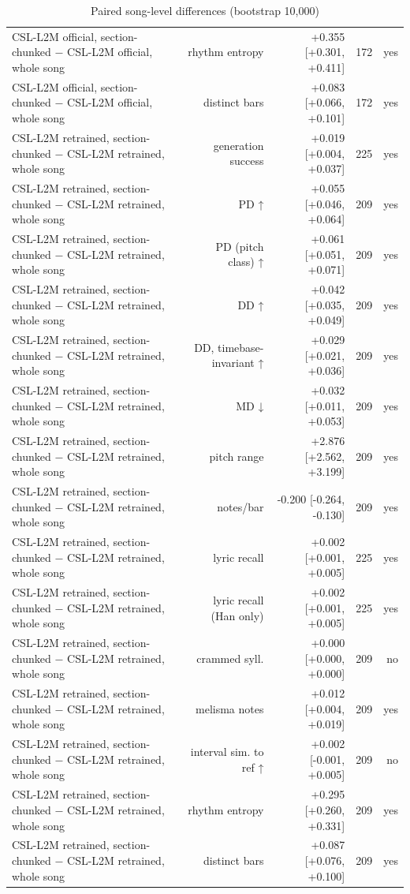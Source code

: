 \begin{table}[t]
\begin{tabular}{lrrrr}
CSL-L2M official, section-chunked $-$ CSL-L2M official, whole song & rhythm entropy & +0.355 [+0.301, +0.411] & 172 & yes \\
CSL-L2M official, section-chunked $-$ CSL-L2M official, whole song & distinct bars & +0.083 [+0.066, +0.101] & 172 & yes \\
CSL-L2M retrained, section-chunked $-$ CSL-L2M retrained, whole song & generation success & +0.019 [+0.004, +0.037] & 225 & yes \\
CSL-L2M retrained, section-chunked $-$ CSL-L2M retrained, whole song & PD ↑ & +0.055 [+0.046, +0.064] & 209 & yes \\
CSL-L2M retrained, section-chunked $-$ CSL-L2M retrained, whole song & PD (pitch class) ↑ & +0.061 [+0.051, +0.071] & 209 & yes \\
CSL-L2M retrained, section-chunked $-$ CSL-L2M retrained, whole song & DD ↑ & +0.042 [+0.035, +0.049] & 209 & yes \\
CSL-L2M retrained, section-chunked $-$ CSL-L2M retrained, whole song & DD, timebase-invariant ↑ & +0.029 [+0.021, +0.036] & 209 & yes \\
CSL-L2M retrained, section-chunked $-$ CSL-L2M retrained, whole song & MD ↓ & +0.032 [+0.011, +0.053] & 209 & yes \\
CSL-L2M retrained, section-chunked $-$ CSL-L2M retrained, whole song & pitch range & +2.876 [+2.562, +3.199] & 209 & yes \\
CSL-L2M retrained, section-chunked $-$ CSL-L2M retrained, whole song & notes/bar & -0.200 [-0.264, -0.130] & 209 & yes \\
CSL-L2M retrained, section-chunked $-$ CSL-L2M retrained, whole song & lyric recall & +0.002 [+0.001, +0.005] & 225 & yes \\
CSL-L2M retrained, section-chunked $-$ CSL-L2M retrained, whole song & lyric recall (Han only) & +0.002 [+0.001, +0.005] & 225 & yes \\
CSL-L2M retrained, section-chunked $-$ CSL-L2M retrained, whole song & crammed syll. & +0.000 [+0.000, +0.000] & 209 & no \\
CSL-L2M retrained, section-chunked $-$ CSL-L2M retrained, whole song & melisma notes & +0.012 [+0.004, +0.019] & 209 & yes \\
CSL-L2M retrained, section-chunked $-$ CSL-L2M retrained, whole song & interval sim. to ref ↑ & +0.002 [-0.001, +0.005] & 209 & no \\
CSL-L2M retrained, section-chunked $-$ CSL-L2M retrained, whole song & rhythm entropy & +0.295 [+0.260, +0.331] & 209 & yes \\
CSL-L2M retrained, section-chunked $-$ CSL-L2M retrained, whole song & distinct bars & +0.087 [+0.076, +0.100] & 209 & yes \\
\bottomrule
\end{tabular}
\caption{Paired song-level differences (bootstrap 10,000)}
\label{tab:lyrics_to_melody_paired_lyrics_all}
\end{table}
